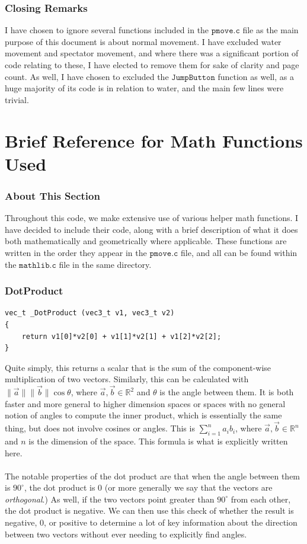 \documentclass{article}
\begin{document}
\section{Closing Remarks}
I have chosen to ignore several functions included in the $\texttt{pmove.c}$ file as the main purpose of this document is about normal movement. I have excluded water movement and spectator movement, and where there was a significant portion of code relating to these, I have elected to remove them for sake of clarity and page count. As well, I have chosen to excluded the $\texttt{JumpButton}$ function as well, as a huge majority of its code is in relation to water, and the main few lines were trivial.
\newpage
\part{Brief Reference for Math Functions Used}
\section{About This Section}
Throughout this code, we make extensive use of various helper math functions. I have decided to include their code, along with a brief description of what it does both mathematically and geometrically where applicable. These functions are written in the order they appear in the $\texttt{pmove.c}$ file, and all can be found within the $\texttt{mathlib.c}$ file in the same directory.
\section{DotProduct}
\begin{verbatim}
vec_t _DotProduct (vec3_t v1, vec3_t v2)
{
	return v1[0]*v2[0] + v1[1]*v2[1] + v1[2]*v2[2];
}

\end{verbatim}
Quite simply, this returns a scalar that is the sum of the component-wise multiplication of two vectors. Similarly, this can be calculated with $\parallel\vec{a}\parallel \parallel\vec{b}\parallel\cos{\theta}$, where $\vec{a},\vec{b}\in\mathbb{R}^2$ and $\theta$ is the angle between them. It is both faster and more general to higher dimension spaces or spaces with no general notion of angles to compute the inner product, which is essentially the same thing, but does not involve cosines or angles. This is $\sum_{i=1}^n a_i b_i$, where $\vec{a},\vec{b}\in\mathbb{R}^n$ and $n$ is the dimension of the space. This formula is what is explicitly written here. \\
\\
The notable properties of the dot product are that when the angle between them is $90^{\circ}$, the dot product is 0 (or more generally we say that the vectors are \textit{orthogonal}.) As well, if the two vectors point greater than $90^{\circ}$ from each other, the dot product is negative. We can then use this check of whether the result is negative, 0, or positive to determine a lot of key information about the direction between two vectors without ever needing to explicitly find angles. 
\end{document}
